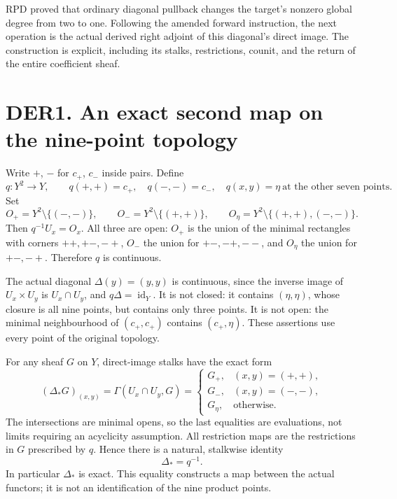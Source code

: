 RPD proved that ordinary diagonal pullback changes the target's nonzero
global degree from two to one. Following the amended forward
instruction, the next operation is the actual derived right adjoint of
this diagonal's direct image. The construction is explicit, including
its stalks, restrictions, counit, and the return of the entire
coefficient sheaf.

\section{DER1. An exact second map on the nine-point
topology}\label{der1.-an-exact-second-map-on-the-nine-point-topology}

Write \(+\), \(-\) for \(c_+\), \(c_-\) inside pairs. Define \[
q:Y^2\longrightarrow Y,\qquad
q(+,+)=c_+,\quad q(-,-)=c_-,\quad
q(x,y)=\eta\ \text{at the other seven points}.
\tag{DER1.1}
\] Set \[
O_+=Y^2\setminus\{(-,-)\},\qquad
O_-=Y^2\setminus\{(+,+)\},\qquad
O_\eta=Y^2\setminus\{(+,+),(-,-)\}.
\tag{DER1.2}
\] Then \(q^{-1}U_x=O_x\). All three are open: \(O_+\) is the union of
the minimal rectangles with corners \(++,+-,-+\), \(O_-\) the union for
\(+-,-+,--\), and \(O_\eta\) the union for \(+-,-+\). Therefore \(q\) is
continuous.

The actual diagonal \(\Delta(y)=(y,y)\) is continuous, since the inverse
image of \(U_x\times U_y\) is \(U_x\cap U_y\), and
\(q\Delta=\operatorname{id}_Y\). It is not closed: it contains
\((\eta,\eta)\), whose closure is all nine points, but contains only
three points. It is not open: the minimal neighbourhood of \((c_+,c_+)\)
contains \((c_+,\eta)\). These assertions use every point of the
original topology.

For any sheaf \(G\) on \(Y\), direct-image stalks have the exact form \[
(\Delta_*G)_{(x,y)}
=\Gamma(U_x\cap U_y,G)
=\begin{cases}
G_+,&(x,y)=(+,+),\\
G_-,&(x,y)=(-,-),\\
G_\eta,&\text{otherwise}.
\end{cases}
\tag{DER1.3}
\] The intersections are minimal opens, so the last equalities are
evaluations, not limits requiring an acyclicity assumption. All
restriction maps are the restrictions in \(G\) prescribed by \(q\).
Hence there is a natural, stalkwise identity \[
\boxed{\Delta_*=q^{-1}.}
\tag{DER1.4}
\] In particular \(\Delta_*\) is exact. This equality constructs a map
between the actual functors; it is not an identification of the nine
product points.

